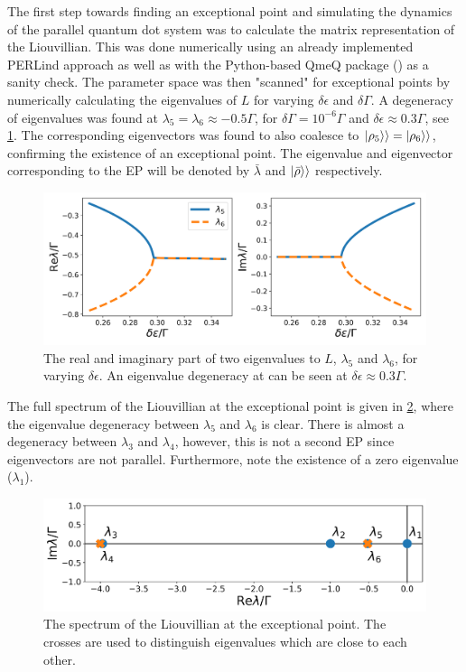 \documentclass[../main.tex]{subfiles}
\begin{document}
The first step towards finding an exceptional point and simulating the dynamics of the parallel quantum dot system was to calculate the matrix representation of the Liouvillian. This was done numerically using an already implemented PERLind approach as well as with the Python-based QmeQ package (\cite{qmeq}) as a sanity check. The parameter space was then "scanned" for exceptional points by numerically calculating the eigenvalues of $L$ for varying $\delta\epsilon$ and $\delta\Gamma$. A degeneracy of eigenvalues was found at $\lambda_5 = \lambda_6\approx -0.5\Gamma$, for $\delta\Gamma = 10^{-6}\Gamma$ and $\delta\epsilon \approx 0.3\Gamma$, see \cref{fig:tuning}. The corresponding eigenvectors was found to also coalesce to $\ket{\rho_5}\rangle = \ket{\rho_6}\rangle$, confirming the existence of an exceptional point. The eigenvalue and eigenvector corresponding to the EP will be denoted by $\bar \lambda$ and $\ket{\bar\rho}\rangle$ respectively.
\begin{figure}[H]
    \centering
    \includegraphics[width=0.9\linewidth]{figures/tuning.png}
    \caption{The real and imaginary part of two eigenvalues to $L$, $\lambda_5$ and $\lambda_6$, for varying $\delta\epsilon$. An eigenvalue degeneracy at can be seen at $\delta\epsilon\approx0.3\Gamma$.}
    \label{fig:tuning}
\end{figure}

The full spectrum of the Liouvillian at the exceptional point is given in \cref{fig:spec}, where the eigenvalue degeneracy between $\lambda_5$ and $\lambda_6$ is clear. There is almost a degeneracy between $\lambda_3$ and $\lambda_4$, however, this is not a second EP since eigenvectors are not parallel. Furthermore, note the existence of a zero eigenvalue ($\lambda_1$).

\begin{figure}[H]
    \centering
    \includegraphics[width=0.8\linewidth]{figures/spectrum.png}
    \caption{The spectrum of the Liouvillian at the exceptional point. The crosses are used to distinguish eigenvalues which are close to each other.}
    \label{fig:spec}
\end{figure}
\end{document}

